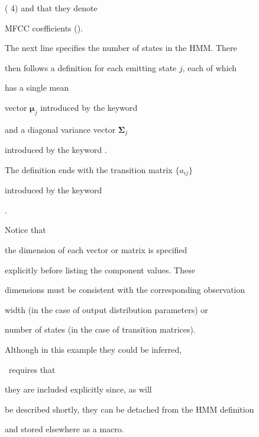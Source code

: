 ( 4) and that they denote


MFCC coefficients ().





The next line specifies the number of states in the HMM. There


then follows a definition for each emitting state $j$, each of which


has a single mean 


vector $\bm{\mu}_j$ introduced by the keyword 




and a diagonal variance vector $\bm{\Sigma}_j$


introduced by the keyword .




The definition ends with the transition matrix $\{a_{ij}\}$


introduced by the keyword 


.  











Notice that


the dimension of each vector or matrix is specified


explicitly before listing the component values.  These


dimensions must be consistent with the corresponding observation 


width (in the case of output distribution parameters) or


number of states (in the case of transition matrices).


Although in this example they could be inferred, 


\HTK\ requires that 


they are included explicitly since, as will


be described shortly, they can be detached from the HMM definition


and stored elsewhere as a macro.









